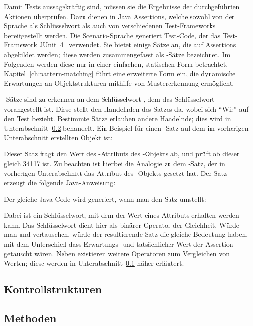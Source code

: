 Damit Tests aussagekräftig sind, müssen sie die Ergebnisse der durchgeführten Aktionen überprüfen.
Dazu dienen in Java Assertions, welche sowohl von der Sprache als Schlüsselwort als auch von verschiedenen Test-Frameworks bereitgestellt werden.
Die Scenario-Sprache generiert Test-Code, der das Test-Framework JUnit~4~\cite{junit4} verwendet.
Sie bietet einige Sätze an, die auf Assertions abgebildet werden;
diese werden zusammengefasst als -Sätze bezeichnet.
Im Folgenden werden diese nur in einer einfachen, statischen Form betrachtet.
Kapitel~\ref{ch:pattern-matching} führt eine erweiterte Form ein, die dynamische Erwartungen an Objektstrukturen mithilfe von Mustererkennung ermöglicht.

-Sätze sind zu erkennen an dem Schlüsselwort , dem das Schlüsselwort  vorangestellt ist.
Diese stellt den Handelnden des Satzes da, wobei sich ``Wir'' auf den Test bezieht.
Bestimmte Sätze erlauben andere Handelnde;
dies wird in Unterabschnitt~\ref{subsec:methods} behandelt.
Ein Beispiel für einen -Satz auf dem im vorherigen Unterabschnitt erstellten Objekt  ist:


Dieser Satz fragt den Wert des -Attributs des -Objekts ab, und prüft ob dieser gleich 34117 ist.
Zu beachten ist hierbei die Analogie zu dem -Satz, der in vorherigen Unterabschnitt das Attribut des -Objekts gesetzt hat.
Der Satz erzeugt die folgende Java-Anweisung:


Der gleiche Java-Code wird generiert, wenn man den Satz umstellt:


Dabei ist  ein Schlüsselwort, mit dem der Wert eines Attributs erhalten werden kann.
Das Schlüsselwort  dient hier als binärer Operator der Gleichheit.
Würde man  und  vertauschen, würde der resultierende Satz die gleiche Bedeutung haben,
mit dem Unterschied dass Erwartungs- und tatsächlicher Wert der Assertion getauscht wären.
Neben  existieren weitere Operatoren zum Vergleichen von Werten;
diese werden in Unterabschnitt~\ref{subsec:control-structures} näher erläutert.

\subsection{Kontrollstrukturen}\label{subsec:control-structures}


\subsection{Methoden}\label{subsec:methods}


